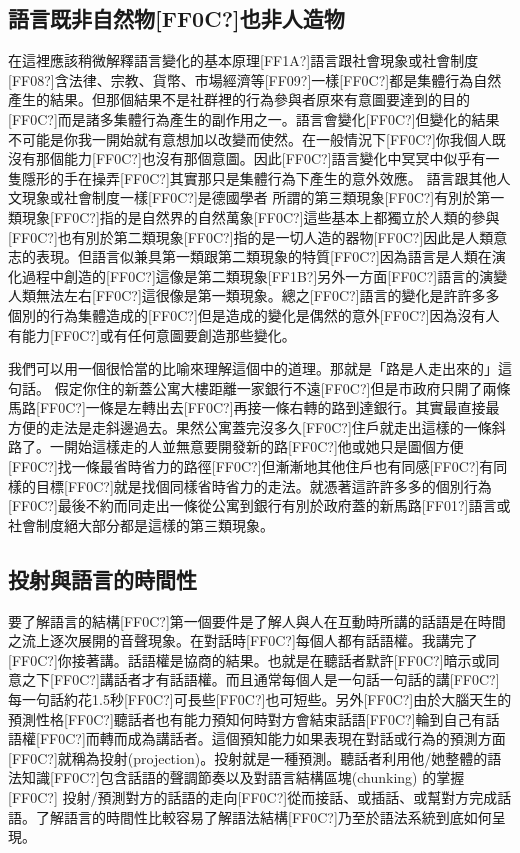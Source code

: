 \subsection{語言既非自然物[FF0C?]也非人造物} %

在這裡應該稍微解釋語言變化的基本原理[FF1A?]語言跟社會現象或社會制度[FF08?]含法律、宗教、貨幣、市場經濟等[FF09?]一樣[FF0C?]都是集體行為自然產生的結果。但那個結果不是社群裡的行為參與者原來有意圖要達到的目的[FF0C?]而是諸多集體行為產生的副作用之一。語言會變化[FF0C?]但變化的結果不可能是你我一開始就有意想加以改變而使然。在一般情況下[FF0C?]你我個人既沒有那個能力[FF0C?]也沒有那個意圖。因此[FF0C?]語言變化中冥冥中似乎有一隻隱形的手在操弄[FF0C?]其實那只是集體行為下產生的意外效應。 語言跟其他人文現象或社會制度一樣[FF0C?]是德國學者\citet{Keller1994} 所謂的第三類現象[FF0C?]有別於第一類現象[FF0C?]指的是自然界的自然萬象[FF0C?]這些基本上都獨立於人類的參與[FF0C?]也有別於第二類現象[FF0C?]指的是一切人造的器物[FF0C?]因此是人類意志的表現。但語言似兼具第一類跟第二類現象的特質[FF0C?]因為語言是人類在演化過程中創造的[FF0C?]這像是第二類現象[FF1B?]另外一方面[FF0C?]語言的演變人類無法左右[FF0C?]這很像是第一類現象。總之[FF0C?]語言的變化是許許多多個別的行為集體造成的[FF0C?]但是造成的變化是偶然的意外[FF0C?]因為沒有人有能力[FF0C?]或有任何意圖要創造那些變化。     

我們可以用一個很恰當的比喻來理解這個中的道理。那就是「路是人走出來的」這句話。 假定你住的新蓋公寓大樓距離一家銀行不遠[FF0C?]但是市政府只開了兩條馬路[FF0C?]一條是左轉出去[FF0C?]再接一條右轉的路到達銀行。其實最直接最方便的走法是走斜邊過去。果然公寓蓋完沒多久[FF0C?]住戶就走出這樣的一條斜路了。一開始這樣走的人並無意要開發新的路[FF0C?]他或她只是圖個方便[FF0C?]找一條最省時省力的路徑[FF0C?]但漸漸地其他住戶也有同感[FF0C?]有同樣的目標[FF0C?]就是找個同樣省時省力的走法。就憑著這許許多多的個別行為[FF0C?]最後不約而同走出一條從公寓到銀行有別於政府蓋的新馬路[FF01?]語言或社會制度絕大部分都是這樣的第三類現象。

\subsection{投射與語言的時間性} %

要了解語言的結構[FF0C?]第一個要件是了解人與人在互動時所講的話語是在時間之流上逐次展開的音聲現象。在對話時[FF0C?]每個人都有話語權。我講完了[FF0C?]你接著講。話語權是協商的結果。也就是在聽話者默許[FF0C?]暗示或同意之下[FF0C?]講話者才有話語權。而且通常每個人是一句話一句話的講[FF0C?]每一句話約花1.5秒[FF0C?]可長些[FF0C?]也可短些。另外[FF0C?]由於大腦天生的預測性格[FF0C?]聽話者也有能力預知何時對方會結束話語[FF0C?]輪到自己有話語權[FF0C?]而轉而成為講話者。這個預知能力如果表現在對話或行為的預測方面[FF0C?]就稱為投射(projection)。投射就是一種預測。聽話者利用他/她整體的語法知識[FF0C?]包含話語的聲調節奏以及對語言結構區塊(chunking) 的掌握[FF0C?] 投射/預測對方的話語的走向[FF0C?]從而接話、或插話、或幫對方完成話語。了解語言的時間性比較容易了解語法結構[FF0C?]乃至於語法系統到底如何呈現。


